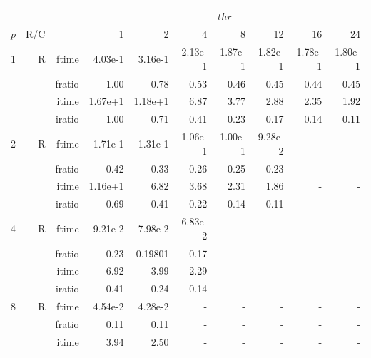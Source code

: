\documentclass[a4paper]{article}
\begin{document}
\begin{table}[htbp]
\begin{center}
\begin{small}
\begin{tabular}{|r|r|r|r|r|r|r|r|r|r|}
\hline 
     & & & \multicolumn{7}{c|}{$thr$} \\ \hline
    $p$ & R/C &  & 1           & 2    & 4    & 8    & 12   & 16    & 24  \\ \hline\hline
   1 &  R &   ftime &    4.03e-1 &    3.16e-1 &    2.13e-1 &    1.87e-1 &    1.82e-1 &    1.78e-1 &    1.80e-1 \\
             &             &  fratio &    1.00 &    0.78 &    0.53 &    0.46 &    0.45 &    0.44 &    0.45 \\
             &             &  itime &    1.67e+1 &   1.18e+1 &   6.87  &    3.77  &    2.88  &    2.35  &    1.92  \\
             &             &  iratio &    1.00 &   0.71 &    0.41 &    0.23 &    0.17 &    0.14 &    0.11 \\\hline
   2 &  R &   ftime &    1.71e-1 &    1.31e-1 &    1.06e-1 &    1.00e-1 &    9.28e-2 &      - &      - \\
             &             &  fratio &    0.42 &    0.33 &    0.26 &    0.25 &    0.23 &      - &      - \\
             &             &  itime &    1.16e+1 &   6.82  &    3.68  &    2.31  &    1.86  &      - &      - \\
             &             &  iratio &    0.69 &   0.41 &    0.22 &    0.14 &    0.11 &      - &      - \\\hline
   4 &  R &   ftime &    9.21e-2 &    7.98e-2 &    6.83e-2 &      - &      - &      - &      - \\
             &             &  fratio &    0.23 &    0.19801 &    0.17 &      - &      - &      - &      - \\
             &             &  itime &    6.92  &    3.99  &    2.29  &      - &      - &      - &      - \\
             &             &  iratio &    0.41 &    0.24 &    0.14 &      - &      - &      - &      - \\\hline
   8 &   R &   ftime &    4.54e-2 &    4.28e-2 &      - &      - &      - &      - &      - \\
             &             &  fratio &    0.11 &   0.11 &      - &      - &      - &      - &      - \\
             &             &  itime &    3.94  &    2.50  &      - &      - &      - &      - &      - \\

\end{tabular}
\end{small}
\end{center}
\end{table}
\end{document}
